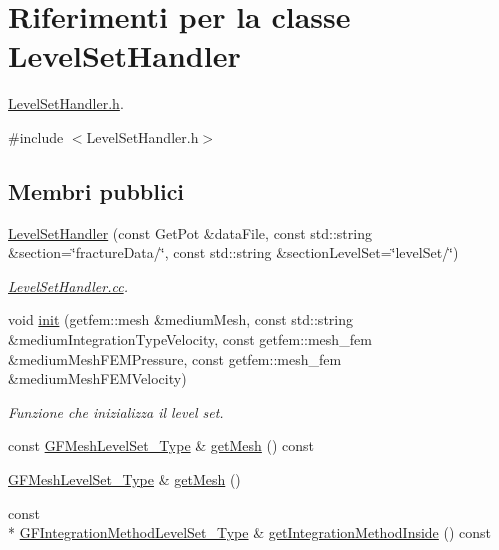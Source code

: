 \hypertarget{classLevelSetHandler}{\section{Riferimenti per la classe Level\-Set\-Handler}
\label{classLevelSetHandler}
}


\hyperlink{LevelSetHandler_8h}{Level\-Set\-Handler.\-h}.  




{\ttfamily \#include $<$Level\-Set\-Handler.\-h$>$}

\subsection*{Membri pubblici}
\begin{DoxyCompactItemize}
\item 
\hyperlink{classLevelSetHandler_a9dbe142d7d4f677abe8c204714c004ed}{Level\-Set\-Handler} (const Get\-Pot \&data\-File, const std\-::string \&section=\char`\"{}fracture\-Data/\char`\"{}, const std\-::string \&section\-Level\-Set=\char`\"{}level\-Set/\char`\"{})
\begin{DoxyCompactList}\small\item\em \hyperlink{LevelSetHandler_8cc}{Level\-Set\-Handler.\-cc}. \end{DoxyCompactList}\item 
void \hyperlink{classLevelSetHandler_a7ee7ade813923dfdef1bc25e9a881580}{init} (getfem\-::mesh \&medium\-Mesh, const std\-::string \&medium\-Integration\-Type\-Velocity, const getfem\-::mesh\-\_\-fem \&medium\-Mesh\-F\-E\-M\-Pressure, const getfem\-::mesh\-\_\-fem \&medium\-Mesh\-F\-E\-M\-Velocity)
\begin{DoxyCompactList}\small\item\em Funzione che inizializza il level set. \end{DoxyCompactList}\item 
const \hyperlink{Core_8h_a126f7165f04db4ed0b72454469145a08}{G\-F\-Mesh\-Level\-Set\-\_\-\-Type} \& \hyperlink{classLevelSetHandler_a6e08147a60f9e8d7ec65357223f72311}{get\-Mesh} () const 
\item 
\hyperlink{Core_8h_a126f7165f04db4ed0b72454469145a08}{G\-F\-Mesh\-Level\-Set\-\_\-\-Type} \& \hyperlink{classLevelSetHandler_a35e4adb6d0c5128445d46f0b489ce0a2}{get\-Mesh} ()
\item 
const \\*
\hyperlink{Core_8h_ade18ba6e17965b6fdd50b3382b2a7020}{G\-F\-Integration\-Method\-Level\-Set\-\_\-\-Type} \& \hyperlink{classLevelSetHandler_a1bf7aa9bad7c2ccec178d4092690775b}{get\-Integration\-Method\-Inside} () const 

\end{DoxyCompactItemize}
